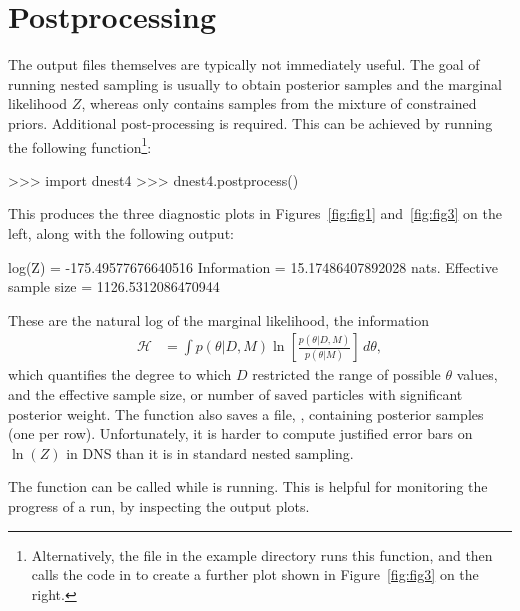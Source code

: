 \documentclass[article]{jss}
\begin{document}
\section{Postprocessing}\label{sec:postprocessing}
The output files themselves are typically not immediately useful.
The goal of running
nested sampling is usually to obtain posterior samples and the marginal likelihood $Z$,
whereas  only contains samples from the mixture of constrained
priors. Additional
post-processing is required. This can be achieved by running the following
 function\footnote{Alternatively, the file
 in the example directory runs this function, and then
calls the code in  to create a further plot shown in
Figure~\ref{fig:fig3} on the right.}:
%
\begin{CodeChunk}
\begin{CodeInput}
>>> import dnest4
>>> dnest4.postprocess()
\end{CodeInput}
\end{CodeChunk}
%
This produces the three diagnostic plots in Figures~\ref{fig:fig1}
and~\ref{fig:fig3} on the left, along with the following output:
%
\begin{CodeChunk}
\begin{CodeOutput}
log(Z) = -175.49577676640516
Information = 15.17486407892028 nats.
Effective sample size = 1126.5312086470944
\end{CodeOutput}
\end{CodeChunk}
%
These are the natural log of the marginal likelihood, the
information
\begin{align*}
\mathcal{H} &= \int p(\theta|D, M)
\ln\left[\frac{p(\theta | D, M)}{p(\theta | M)}\right] \, d\theta,
\end{align*}
which quantifies the degree to which $D$ restricted the
range of possible $\theta$ values,
and the effective sample size,
or number of saved particles with significant posterior weight.
The  function also saves a file,
, containing posterior samples (one per row).
Unfortunately, it is harder to compute justified error bars on $\ln(Z)$
in DNS than it is in standard nested sampling.

The  function can be called while  is running.
This is helpful for monitoring the progress of a run, by inspecting the
output plots.
\end{document}
